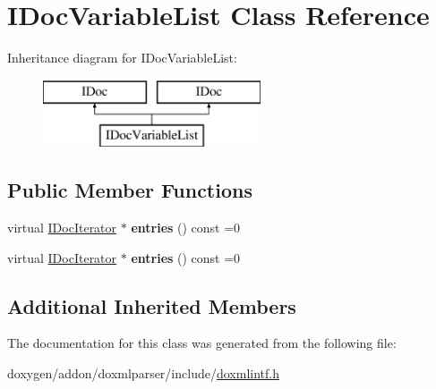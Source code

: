 \hypertarget{class_i_doc_variable_list}{}\section{I\+Doc\+Variable\+List Class Reference}
\label{class_i_doc_variable_list}
Inheritance diagram for I\+Doc\+Variable\+List\+:\begin{figure}[H]
\begin{center}
\leavevmode
\includegraphics[height=2.000000cm]{class_i_doc_variable_list}
\end{center}
\end{figure}
\subsection*{Public Member Functions}
\begin{DoxyCompactItemize}
\item 
\mbox{\label{class_i_doc_variable_list_a9116ee159784e862a62285893d4794c0}} 
virtual \mbox{\hyperlink{class_i_doc_iterator}{I\+Doc\+Iterator}} $\ast$ {\bfseries entries} () const =0
\item 
\mbox{\label{class_i_doc_variable_list_a9116ee159784e862a62285893d4794c0}} 
virtual \mbox{\hyperlink{class_i_doc_iterator}{I\+Doc\+Iterator}} $\ast$ {\bfseries entries} () const =0
\end{DoxyCompactItemize}
\subsection*{Additional Inherited Members}


The documentation for this class was generated from the following file\+:\begin{DoxyCompactItemize}
\item 
doxygen/addon/doxmlparser/include/\mbox{\hyperlink{include_2doxmlintf_8h}{doxmlintf.\+h}}\end{DoxyCompactItemize}

